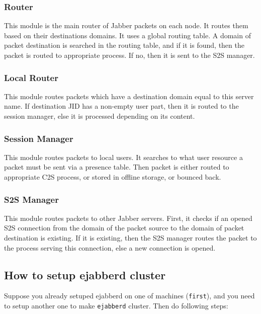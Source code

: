 \documentclass[a4paper,10pt]{article}
\newcommand{\term}[1]{\texttt{#1}}
\newcommand{\ejabberd}{\texttt{ejabberd}}
\newcommand{\Jabber}{Jabber}
\begin{document}
\subsubsection{Router}

This module is the main router of \Jabber{} packets on each node.  It
routes them based on their destinations domains.  It uses a global
routing table.  A domain of packet destination is searched in the
routing table, and if it is found, then the packet is routed to
appropriate process.  If no, then it is sent to the S2S manager.


\subsubsection{Local Router}

This module routes packets which have a destination domain equal to
this server name.  If destination JID has a non-empty user part, then
it is routed to the session manager, else it is processed depending on
its content.


\subsubsection{Session Manager}

This module routes packets to local users.  It searches to what user
resource a packet must be sent via a presence table.  Then packet is
either routed to appropriate C2S process, or stored in offline
storage, or bounced back.


\subsubsection{S2S Manager}

This module routes packets to other \Jabber{} servers.  First, it
checks if an opened S2S connection from the domain of the packet
source to the domain of packet destination is existing.  If it is
existing, then the S2S manager routes the packet to the process
serving this connection, else a new connection is opened.


\subsection{How to setup ejabberd cluster}
\label{sec:cluster}

Suppose you already setuped ejabberd on one of machines (\term{first}), and
you need to setup another one to make \ejabberd{} cluster.  Then do
following steps:
\end{document}
